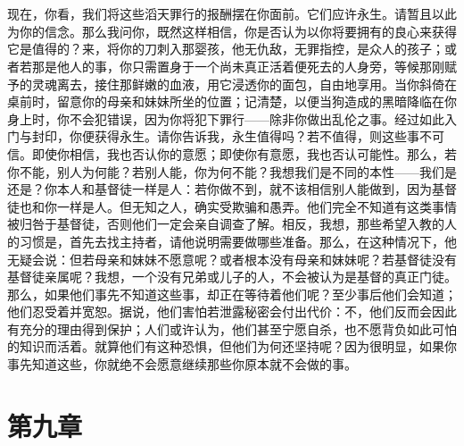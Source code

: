 
\section{}

现在，你看，我们将这些滔天罪行的报酬摆在你面前。它们应许永生。请暂且以此为你的信念。那么我问你，既然这样相信，你是否认为以你将要拥有的良心来获得它是值得的？来，将你的刀刺入那婴孩，他无仇敌，无罪指控，是众人的孩子；或者若那是他人的事，你只需置身于一个尚未真正活着便死去的人身旁，等候那刚赋予的灵魂离去，接住那鲜嫩的血液，用它浸透你的面包，自由地享用。当你斜倚在桌前时，留意你的母亲和妹妹所坐的位置；记清楚，以便当狗造成的黑暗降临在你身上时，你不会犯错误，因为你将犯下罪行——除非你做出乱伦之事。经过如此入门与封印，你便获得永生。请你告诉我，永生值得吗？若不值得，则这些事不可信。即使你相信，我也否认你的意愿；即使你有意愿，我也否认可能性。那么，若你不能，别人为何能？若别人能，你为何不能？我想我们是不同的本性——我们是还是？你本人和基督徒一样是人：若你做不到，就不该相信别人能做到，因为基督徒也和你一样是人。但无知之人，确实受欺骗和愚弄。他们完全不知道有这类事情被归咎于基督徒，否则他们一定会亲自调查了解。相反，我想，那些希望入教的人的习惯是，首先去找主持者，请他说明需要做哪些准备。那么，在这种情况下，他无疑会说：但若母亲和妹妹不愿意呢？或者根本没有母亲和妹妹呢？若基督徒没有基督徒亲属呢？我想，一个没有兄弟或儿子的人，不会被认为是基督的真正门徒。那么，如果他们事先不知道这些事，却正在等待着他们呢？至少事后他们会知道；他们忍受着并宽恕。据说，他们害怕若泄露秘密会付出代价：不，他们反而会因此有充分的理由得到保护；人们或许认为，他们甚至宁愿自杀，也不愿背负如此可怕的知识而活着。就算他们有这种恐惧，但他们为何还坚持呢？因为很明显，如果你事先知道这些，你就绝不会愿意继续那些你原本就不会做的事。\par


\section{第九章}

